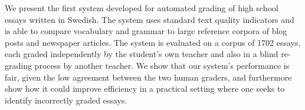 We present the first system developed for automated grading of high school essays written in Swedish.
 The system uses standard text quality indicators and is able to compare
 vocabulary and grammar to large reference corpora of blog posts and newspaper
 articles.
 The system is evaluated on a corpus of 1702 essays, each
 graded independently by the student's own teacher and also in a
 blind re-grading process by another teacher.
 We show that our system's performance is fair, given
 the low agreement between the two human graders, and furthermore show how it
 could improve efficiency in a practical setting where one seeks to identify
 incorrectly graded essays.

